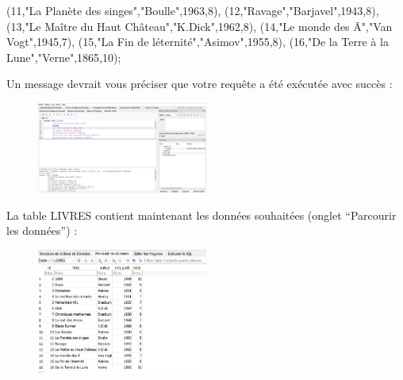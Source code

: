 \documentclass[
  a4paper,
  DIV=11,
  numbers=noendperiod]{scrartcl}
\newenvironment{Shaded}{\begin{snugshade}}{\end{snugshade}}
\newcommand{\DecValTok}[1]{\textcolor[rgb]{0.68,0.00,0.00}{#1}}
\newcommand{\NormalTok}[1]{\textcolor[rgb]{0.00,0.23,0.31}{#1}}
\newcommand{\OtherTok}[1]{\textcolor[rgb]{0.00,0.23,0.31}{#1}}
\begin{document}
\begin{enumerate}
\begin{Shaded}
\begin{Highlighting}[]
\NormalTok{    (}\DecValTok{11}\NormalTok{,}\OtherTok{"La Planète des singes"}\NormalTok{,}\OtherTok{"Boulle"}\NormalTok{,}\DecValTok{1963}\NormalTok{,}\DecValTok{8}\NormalTok{),}
\NormalTok{    (}\DecValTok{12}\NormalTok{,}\OtherTok{"Ravage"}\NormalTok{,}\OtherTok{"Barjavel"}\NormalTok{,}\DecValTok{1943}\NormalTok{,}\DecValTok{8}\NormalTok{),}
\NormalTok{    (}\DecValTok{13}\NormalTok{,}\OtherTok{"Le Maître du Haut Château"}\NormalTok{,}\OtherTok{"K.Dick"}\NormalTok{,}\DecValTok{1962}\NormalTok{,}\DecValTok{8}\NormalTok{),}
\NormalTok{    (}\DecValTok{14}\NormalTok{,}\OtherTok{"Le monde des Ā"}\NormalTok{,}\OtherTok{"Van Vogt"}\NormalTok{,}\DecValTok{1945}\NormalTok{,}\DecValTok{7}\NormalTok{),}
\NormalTok{    (}\DecValTok{15}\NormalTok{,}\OtherTok{"La Fin de l\textquotesingle{}éternité"}\NormalTok{,}\OtherTok{"Asimov"}\NormalTok{,}\DecValTok{1955}\NormalTok{,}\DecValTok{8}\NormalTok{),}
\NormalTok{    (}\DecValTok{16}\NormalTok{,}\OtherTok{"De la Terre à la Lune"}\NormalTok{,}\OtherTok{"Verne"}\NormalTok{,}\DecValTok{1865}\NormalTok{,}\DecValTok{10}\NormalTok{);}
\end{Highlighting}
\end{Shaded}

  Un message devrait vous préciser que votre requête a été exécutée avec
  succès :

  \begin{figure}

  {\centering \includegraphics[width=0.5\textwidth,height=\textheight]{TP1_5.png}

  }

  \end{figure}

  La table LIVRES contient maintenant les données souhaitées (onglet
  ``Parcourir les données'') :

  \begin{figure}

  {\centering \includegraphics[width=0.5\textwidth,height=\textheight]{TP1_6.png}

}
\end{figure}
\end{enumerate}
\end{document}
